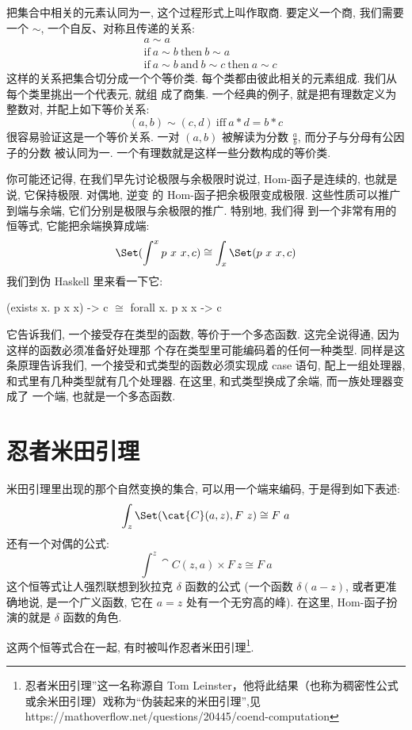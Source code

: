 把集合中相关的元素认同为一, 这个过程形式上叫作取商. 要定义一个商, 我们需要一个  $\sim$, 一个自反、对称且传递的关系:
\begin{align*}
   & a \sim a                                                         \\
   & \text{if}\ a \sim b\ \text{then}\ b \sim a                       \\
   & \text{if}\ a \sim b\ \text{and}\ b \sim c\ \text{then}\ a \sim c
\end{align*}
这样的关系把集合切分成一个个等价类. 每个类都由彼此相关的元素组成. 我们从每个类里挑出一个代表元, 就组
成了商集. 一个经典的例子, 就是把有理数定义为整数对, 并配上如下等价关系:
\[(a, b) \sim (c, d)\ \text{iff}\ a * d = b * c\]
很容易验证这是一个等价关系. 一对 $(a, b)$ 被解读为分数 $\frac{a}{b}$, 而分子与分母有公因子的分数
被认同为一. 一个有理数就是这样一些分数构成的等价类.

你可能还记得, 在我们早先讨论极限与余极限时说过, Hom-函子是连续的, 也就是说, 它保持极限. 对偶地, 逆变
的 Hom-函子把余极限变成极限. 这些性质可以推广到端与余端, 它们分别是极限与余极限的推广. 特别地, 我们得
到一个非常有用的恒等式, 它能把余端换算成端:
\[\Set(\int^x p\ x\ x, c) \cong \int_x \Set(p\ x\ x, c)\]
我们到伪 Haskell 里来看一下它:

\begin{snipv}
(exists x. p x x) -> c \ensuremath{\cong} forall x. p x x -> c
\end{snipv}
它告诉我们, 一个接受存在类型的函数, 等价于一个多态函数. 这完全说得通, 因为这样的函数必须准备好处理那
个存在类型里可能编码着的任何一种类型. 同样是这条原理告诉我们, 一个接受和式类型的函数必须实现成 case
语句, 配上一组处理器, 和式里有几种类型就有几个处理器. 在这里, 和式类型换成了余端, 而一族处理器变成了
一个端, 也就是一个多态函数.

\section{忍者米田引理}

米田引理里出现的那个自然变换的集合, 可以用一个端来编码, 于是得到如下表述:
\[\int_z \Set(\cat{C}(a, z), F\ z) \cong F\ a\]
还有一个对偶的公式:
\[\int^z \cat{C}(z, a)\times{}F\ z \cong F\ a\]
这个恒等式让人强烈联想到狄拉克 $\delta$ 函数的公式 (一个函数 $\delta(a - z)$, 或者更准确地说,
是一个广义函数, 它在 $a = z$ 处有一个无穷高的峰). 在这里, Hom-函子扮演的就是 $\delta$ 函数的角色.

这两个恒等式合在一起, 有时被叫作忍者米田引理\footnote{忍者米田引理”这一名称源自
Tom Leinster，他将此结果（也称为稠密性公式或余米田引理）戏称为“伪装起来的米田引理”,见 https://mathoverflow.net/questions/20445/coend-computation}.


